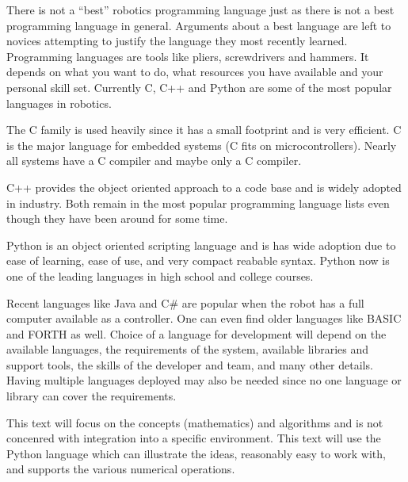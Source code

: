 There is not a ``best'' robotics programming language just as there is
not a best programming language in general. Arguments about a best
language are left to novices attempting to justify the language they
most recently learned. Programming languages are tools like pliers,
screwdrivers and hammers. It depends on what you want to do, what
resources you have available and your personal skill set. Currently C,
C++ and Python are some of the most popular languages in robotics.

The C family is used heavily since it has a small footprint and is very
efficient. C is the major language for embedded systems (C fits on
microcontrollers). Nearly all systems have a C compiler and maybe only a
C compiler.

C++ provides the object oriented approach to a code base and is widely
adopted in industry. Both remain in the most popular programming
language lists even though they have been around for some time.

Python is an object oriented scripting language and is has wide adoption
due to ease of learning, ease of use, and very compact reabable syntax.
Python now is one of the leading languages in high school and college
courses.

Recent languages like Java and C\# are popular when the robot has a full
computer available as a controller. One can even find older languages
like BASIC and FORTH as well. Choice of a language for development will
depend on the available languages, the requirements of the system,
available libraries and support tools, the skills of the developer and
team, and many other details. Having multiple languages deployed may
also be needed since no one language or library can cover the
requirements.

This text will focus on the concepts (mathematics) and algorithms and is
not concenred with integration into a specific environment. This text
will use the Python language which can illustrate the ideas, reasonably
easy to work with, and supports the various numerical operations.
